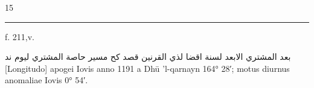 \documentclass[11pt]{article}
\newcommand{\AbjadZero}{{\NallinoSigns\symbol{"E000}}}
\begin{document}
\vspace{-2mm}\noindent\hfill{\small 15}\hspace*{14mm}
\clearpage
\noindent{}
\par\vspace{-1mm}\noindent\rule{\textwidth}{.4pt}\par\vspace{1mm}
\begin{center}{\small f. 211,v.}\end{center}\vspace{-3mm}
\begin{center}\textarabic{بعد المشتري الابعد لسنة اقضا لذي القرنين قصد كح مسير حاصة المشتري ليوم \AbjadZero{} ند}\\[1mm]{\small [Longitudo] apogei Iovis anno 1191 a Dhū ’l-qarnayn 164° 28′; motus diurnus anomaliae Iovis 0° 54′.}\end{center}\vspace{-2mm}
\end{document}
